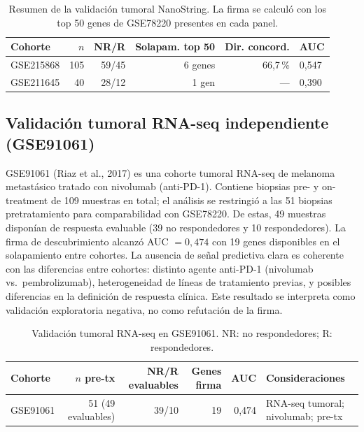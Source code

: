 \begin{table}[H]
\centering
\caption{Resumen de la validación tumoral NanoString. La firma se calculó con los top 50 genes de GSE78220 presentes en cada panel.}
\label{tab:validacion_tumoral}
\begin{tabularx}{\textwidth}{l r r r r X}
\toprule
Cohorte & $n$ & NR/R & Solapam. top 50 & Dir. concord. & AUC \\
\midrule
GSE215868 & 105 & 59/45 & 6 genes & 66{,}7\,\% & 0{,}547 \\
GSE211645 & 40 & 28/12 & 1 gen & --- & 0{,}390 \\
\bottomrule
\end{tabularx}
\end{table}

\subsection{Validación tumoral RNA-seq independiente (GSE91061)}

GSE91061 \cite{GSE91061,Riaz2017} (Riaz et al., 2017) es una cohorte tumoral RNA-seq de melanoma metastásico tratado con nivolumab (anti-PD-1). Contiene biopsias pre- y on-treatment de 109 muestras en total; el análisis se restringió a las 51 biopsias pretratamiento para comparabilidad con GSE78220. De estas, 49 muestras disponían de respuesta evaluable (39 no respondedores y 10 respondedores). La firma de descubrimiento alcanzó AUC $= 0{,}474$ con 19 genes disponibles en el solapamiento entre cohortes. La ausencia de señal predictiva clara es coherente con las diferencias entre cohortes: distinto agente anti-PD-1 (nivolumab vs.\ pembrolizumab), heterogeneidad de líneas de tratamiento previas, y posibles diferencias en la definición de respuesta clínica. Este resultado se interpreta como validación exploratoria negativa, no como refutación de la firma.

\begin{table}[H]
\centering
\caption{Validación tumoral RNA-seq en GSE91061. NR: no respondedores; R: respondedores.}
\label{tab:validacion_rnaseq}
\begin{tabularx}{\textwidth}{l r r r r X}
\toprule
Cohorte & $n$ pre-tx & NR/R evaluables & Genes firma & AUC & Consideraciones \\
\midrule
GSE91061 & 51 (49 evaluables) & 39/10 & 19 & 0{,}474 & RNA-seq tumoral; nivolumab; pre-tx \\
\bottomrule
\end{tabularx}
\end{table}

